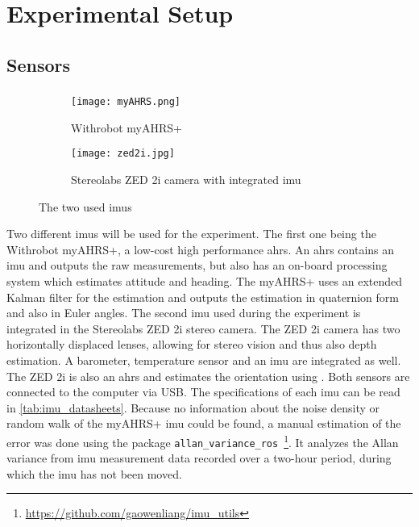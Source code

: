 \chapter{Experimental Setup}
\label{ch:ExperimentalSetup}

\section{Sensors}
\subsection{}
\begin{figure}[htb]
	\centering
	\begin{subfigure}[b]{0.4\textwidth}
		\centering
		\texttt{[image: myAHRS.png]}
		\caption{Withrobot myAHRS+ \cite{Withrobot2017}}
		\label{fig:imu_myahrs}
	\end{subfigure}
	\begin{subfigure}[b]{0.4\textwidth}
		\centering
		\texttt{[image: zed2i.jpg]}
		\caption{Stereolabs ZED 2i camera with integrated \acrshort{imu} \cite{Stereolabs2019}}
		\label{fig:imu_zed}
	\end{subfigure}
	\caption{The two used \acrshort{imu}s}
	\label{fig:imus_used}
\end{figure}
Two different \gls{imu}s will be used for the experiment.
The first one being the Withrobot myAHRS+, a low-cost high performance \gls{ahrs}.
An \gls{ahrs} contains an \gls{imu} and outputs the raw measurements, but also has an on-board processing system which estimates attitude and heading.
The myAHRS+ uses an extended Kalman filter for the estimation and outputs the estimation in quaternion form and also in Euler angles.
The second \gls{imu} used during the experiment is integrated in the Stereolabs ZED 2i stereo camera.
The ZED 2i camera has two horizontally displaced lenses, allowing for stereo vision and thus also depth estimation.
A barometer, temperature sensor and an \gls{imu} are integrated as well.
The ZED 2i is also an \gls{ahrs} and estimates the orientation using .
Both sensors are connected to the computer via USB.
The specifications of each \gls{imu} can be read in \cref{tab:imu_datasheets}.
Because no information about the noise density or random walk of the myAHRS+ \gls{imu} could be found, a manual estimation of the error was done using the package \texttt{allan\_variance\_ros}~\footnote{\url{https://github.com/gaowenliang/imu_utils}}.
It analyzes the Allan variance from \gls{imu} measurement data recorded over a two-hour period, during which the \gls{imu} has not been moved.

